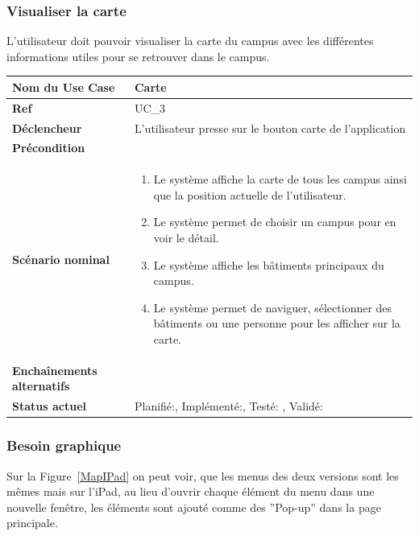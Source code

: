 		\subsubsection{Visualiser la carte}
					L'utilisateur doit pouvoir visualiser la carte du campus avec les différentes informations utiles pour se retrouver dans le campus.\\[0.2cm]
					\begin{longtable}{|l|p{10cm}|}
						\hline \textbf{Nom du Use Case} & Carte \\ 
						\hline \textbf{Ref} & UC\_3  \\ 
						\hline \textbf{Déclencheur} & L'utilisateur presse sur le bouton carte de l'application \\
						\hline \textbf{Précondition} &  \\
						\hline \textbf{Scénario nominal} & 
						\begin{enumerate}
							\item Le système affiche la carte de tous les campus ainsi que la position actuelle de l'utilisateur.
							\item Le système permet de choisir un campus pour en voir le détail.
							\item Le système affiche les bâtiments principaux du campus.
							\item Le système permet de naviguer, sélectionner des bâtiments ou une personne pour les afficher sur la carte.
						\end{enumerate}
						\\ 
						\hline \textbf{Enchaînements alternatifs} & \\
						\hline \textbf{Status actuel} & Planifié:\CheckedBox , Implémenté:\CheckedBox  , Testé: \CheckedBox  , Validé: \CheckedBox  \\
						\hline 
					\end{longtable} 
			\subsubsection*{Besoin graphique}

					Sur la Figure~\ref{MapIPad} on peut voir, que les menus des deux versions sont les mêmes mais sur l'iPad, au lieu d'ouvrir chaque élément du menu dans une nouvelle fenêtre, les éléments sont ajouté comme des ''Pop-up'' dans la page principale.

